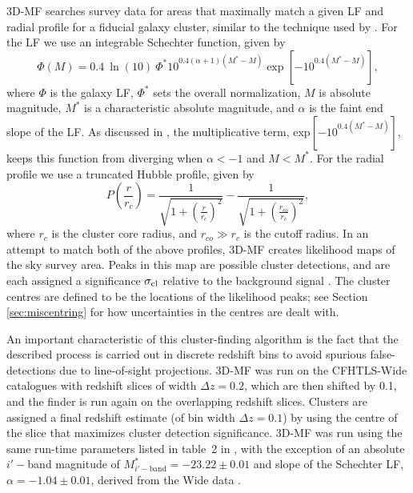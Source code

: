 \ac{3D-MF} searches survey data for areas that maximally match a given \ac{LF} and radial profile for a fiducial galaxy cluster, similar to the technique used by \citet{Postman96}.  For the \ac{LF} we use an integrable Schechter function, given by
\begin{equation}
\Phi(M)=0.4 \ \ln(10) \ \Phi^* 10^{0.4(\alpha + 1)(M^*-M)} \exp \left[ -10^{0.4(M^*-M)} \right],
\end{equation}
where $\Phi$ is the galaxy \ac{LF}, $\Phi^*$ sets the overall normalization, $M$ is absolute magnitude, $M^*$ is a characteristic absolute magnitude, and $\alpha$ is the faint end slope of the \ac{LF}. As discussed in \citet{Milkeraitis10}, the multiplicative term, exp$[-10^{0.4(M^{*}-M)}]$, keeps this function from diverging when $\alpha < -1$ and $M < M^*$. For the radial profile we use a truncated Hubble profile, given by
\begin{equation}
P \left ( \frac{r}{r_c} \right )=\frac{1}{\sqrt{1+ \left ( \frac{r}{r_c} \right ) ^2}} - \frac{1}{\sqrt{1+ \left ( \frac{r_{co}}{r_c} \right ) ^2}},
\end{equation}
where $r_c$ is the cluster core radius, and $r_{co} \gg r_c$ is the cutoff radius. In an attempt to match both of the above profiles, \ac{3D-MF} creates likelihood maps of the sky survey area. Peaks in this map are possible cluster detections, and are each assigned a significance $\sigma_{\rm cl}$ relative to the background signal \citep[$\sigma_{\rm cl}$ is calculated using Equation 5 of][which the reader is referred to for more details]{Milkeraitis10}. The cluster centres are defined to be the locations of the likelihood peaks; see Section \ref{sec:miscentring} for how uncertainties in the centres are dealt with.

An important characteristic of this cluster-finding algorithm is the fact that the described process is carried out in discrete redshift bins to avoid spurious false-detections due to line-of-sight projections. \ac{3D-MF} was run on the \ac{CFHTLS}-Wide catalogues with redshift slices of width $\Delta z = 0.2$, which are then shifted by 0.1, and the finder is run again on the overlapping redshift slices. Clusters are assigned a final redshift estimate (of bin width $\Delta z = 0.1$) by using the centre of the slice that maximizes cluster detection significance. \ac{3D-MF} was run using the same run-time parameters listed in table~2 in \citet{Milkeraitis10}, with the exception of an absolute $i'-$band magnitude of $M^*_{i'-\mathrm{band}}=-23.22 \pm 0.01$ and slope of the Schechter \ac{LF}, $\alpha=-1.04 \pm 0.01$, derived from the Wide data \citep{MMthesis11}.

